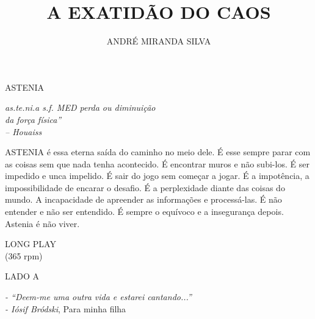 \documentclass[20pt]{book}
\title{A EXATIDÃO DO CAOS}
\author{ANDRÉ MIRANDA SILVA}
\date{}
\begin{document}
\maketitle

\newpage
\thispagestyle{empty}
\mbox{}
\newpage

\vspace*{\fill}
\begin{center}\Large{ASTENIA}\end{center}
\begin{flushright}
\textit{
as.te.ni.a s.f. MED perda ou diminuição\\
da força física”\\
– Houaiss}
\end{flushright}
\vspace{\fill}

\clearpage
ASTENIA é essa eterna saída do caminho no meio dele. É esse
sempre parar com as coisas sem que nada tenha acontecido. É
encontrar muros e não subi-los. É ser impedido e unca impelido. É
sair do jogo sem começar a jogar. É a impotência, a impossibilidade
de encarar o desafio. É a perplexidade diante das coisas do mundo. A
incapacidade de apreender as informações e processá-las. É não
entender e não ser entendido. É sempre o equívoco e a insegurança
depois. Astenia é não viver.
\clearpage

\clearpage

\clearpage

\clearpage

\clearpage

\clearpage

\clearpage

\clearpage

\clearpage

\clearpage

\clearpage

\clearpage

\clearpage

\clearpage

\clearpage

\clearpage

\clearpage

\vspace*{\fill}
\begin{center}
\Large{
LONG PLAY\\
(365 rpm)}
\end{center}
\vspace{\fill}

\clearpage

\vspace*{\fill}
\begin{center}
\Large{
LADO A}
\end{center}
\begin{flushright}
\large{
\textit{- “Deem-me uma outra vida e estarei cantando...”\\
- Iósif Bródski}, Para minha filha
}
\end{flushright}
\vspace{\fill}
\end{document}
